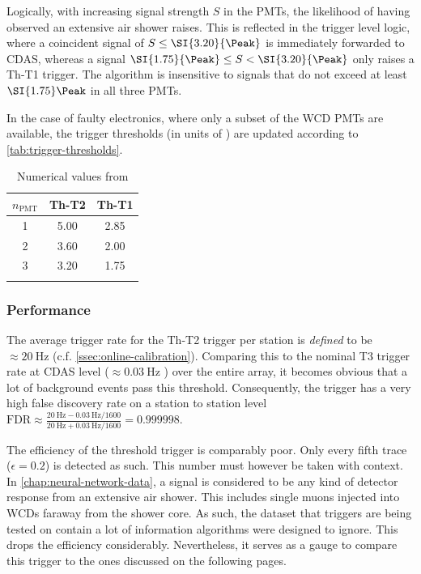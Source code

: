 Logically, with increasing signal strength $S$ in the PMTs, the likelihood of having observed an extensive air shower raises. This is reflected in the trigger 
level logic, where a coincident signal of $S\leq\SI{3.20}{\Peak}$ is immediately forwarded to CDAS, whereas a signal $\SI{1.75}{\Peak}\leq S<\SI{3.20}{\Peak}$ 
only raises a Th-T1 trigger. The algorithm is insensitive to signals that do not exceed at least $\SI{1.75}\Peak$ in all three PMTs.

In the case of faulty electronics, where only a subset of the WCD PMTs are available, the trigger thresholds (in units of \SI{}{\Peak}) are updated according to 
\autoref{tab:trigger-thresholds}.

\begin{table}[h]
	\begin{center}
	\caption{Numerical values from \cite{triggerSettings}}
	\begin{tabular*}{0.4\textwidth}{@{\extracolsep{\fill}} ccc}
		\toprule
		$n_\text{PMT}$ & Th-T2 & Th-T1 \\
		\midrule
		1 & 5.00 & 2.85 \\
		2 & 3.60 & 2.00 \\
		3 & 3.20 & 1.75 \\
		\bottomrule
	\label{tab:trigger-thresholds}
	\end{tabular*}
	\end{center}
\end{table}

\subsubsection{Performance}
\label{ssec:th-performance}

The average trigger rate for the Th-T2 trigger per station is \textit{defined} to be $\approx\SI{20}{\hertz}$ (c.f. \autoref{ssec:online-calibration}). Comparing 
this to the nominal T3 trigger rate at CDAS level ($\approx\SI{0.03}{\hertz}$ \cite{abraham2010trigger}) over the entire array, it becomes obvious that a lot of 
background events pass this threshold. Consequently, the trigger has a very high false discovery rate on a station to station level
$\text{FDR}\approx\frac{\SI{20}{\hertz} - \SI{0.03}{\hertz}/1600}{\SI{20}{\hertz} + \SI{0.03}{\hertz}/1600}=0.999998$.

The efficiency of the threshold trigger is comparably poor. Only every fifth trace ($\epsilon = 0.2$) is detected as such. This number must however be taken with 
context. In \autoref{chap:neural-network-data}, a signal is considered to be any kind of detector response from an extensive air shower. This includes single muons
injected into WCDs faraway from the shower core. As such, the dataset that triggers are being tested on contain a lot of information algorithms were designed to 
ignore. This drops the efficiency considerably. Nevertheless, it serves as a gauge to compare this trigger to the ones discussed on the following pages.

